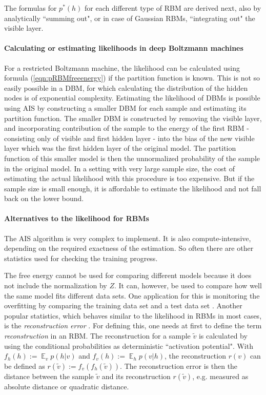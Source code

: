 \documentclass[12pt]{article}
\DeclareMathOperator{\EX}{\mathbb{E}}
\begin{document}
The formulas for $p^*(h)$ for each different type of RBM are derived next, also by analytically ``summing out", or in case of Gaussian RBMs, ``integrating out" the visible layer.




\paragraph{Calculating or estimating likelihoods in deep Boltzmann machines} %
For a restricted Boltzmann machine, the likelihood can be calculated using formula (\ref{eqn:pRBMfreeenergy}) if the partition function is known. This is not so easily possible in a DBM, for which calculating the distribution of the hidden nodes is of exponential complexity.
Estimating the likelihood of DBMs is possible using AIS by constructing a smaller DBM for each sample and estimating its partition function.
The smaller DBM is constructed by removing the visible layer, and incorporating contribution of the sample to the energy of the first RBM - consisting only of visible and first hidden layer - into the bias of the new visible layer which was the first hidden layer of the original model.
The partition function of this smaller model is then the unnormalized probability of the sample in the original model.
In a setting with very large sample size, the cost of estimating the actual likelihood with this procedure is too expensive. But if the sample size is small enough, it is affordable to estimate the likelihood and not fall back on the lower bound.

\paragraph{Alternatives to the likelihood for RBMs}
The AIS algorithm is very complex to implement.
It is also compute-intensive, depending on the required exactness of the estimation.
So often there are other statistics used for checking the training progress.

The free energy cannot be used for comparing different models because it does not include the normalization by $Z$.
It can, however, be used to compare how well the same model fits different data sets.
One application for this is monitoring the overfitting by comparing the training data set and a test data set \citep{hinton_practical_2012}.
\label{reconstructionerror}
Another popular statistics, which behaves similar to the likelihood in RBMs in most cases, is the {\em reconstruction error} \citep{hinton_practical_2012}.
For defining this, one needs at first to define the term {\em reconstruction} in an RBM.
The reconstruction \citep{hinton_practical_2012} for a sample $\widetilde{v}$ is calculated by using the conditional probabilities as deterministic ``activation potential".
With $f_h(h) := \EX_v p(h|v)$ and $f_v(h) := \EX_h p(v|h)$, the reconstruction $r(v)$ can be defined as $r(\widetilde{v}) := f_v(f_h(\widetilde{v}))$. The reconstruction error is then the distance between the sample $\widetilde{v}$ and its reconstruction $r(\widetilde{v})$, e.g. measured as absolute distance or quadratic distance.
\end{document}
